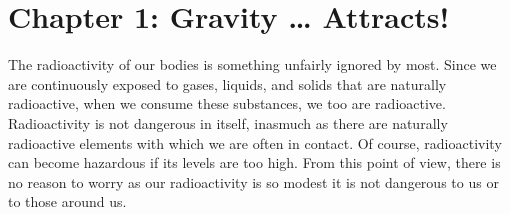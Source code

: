 \section*{Chapter 1: Gravity … Attracts!}
\begin{description}[style=multiline,leftmargin=2em,labelwidth=1.5em]

\item[1.]\hypertarget{note:01-01}{}The radioactivity of our bodies is something unfairly
ignored by most. Since we are continuously exposed to gases, liquids, and solids that
are naturally radioactive, when we consume these substances, we too are radioactive.
Radioactivity is not dangerous in itself, inasmuch as there are naturally radioactive
elements with which we are often in contact. Of course, radioactivity can become
hazardous if its levels are too high. From this point of view, there is no reason to
worry as our radioactivity is so modest it is not dangerous to us or to those around us.

\end{description}
